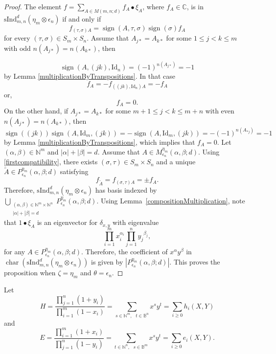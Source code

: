 \documentclass[12pt,reqno]{amsart}
\theoremstyle{definition}
\theoremstyle{remark}
\newcommand{\ind}{\mathrm{sInd}_{m,n}^{d}}
\DeclareMathOperator{\ch}{char}
\DeclareMathOperator{\sign}{sign}
\begin{document}
\begin{proof}
The element $f = \sum_{A\in M(m,n;d)}f_{A}\bullet\xi_{A}$, where $f_{A}\in\mathbb{C}$, is in $\ind(\eta_{m}\otimes \epsilon_{n})$ if and only if
\begin{equation}\label{secondcompatibility}
    f_{(\tau,\sigma)A}=\sign(A,\tau,\sigma)\sign(\sigma)f_{A}
\end{equation}
for every $(\tau,\sigma)\in S_m\times S_n$. Assume that $A_{j*}=A_{k*}$ for some $1\leq j<k\leq m$ with odd $n(A_{j*})=n(A_{k*})$, then

$$\sign(A,(jk),\mathrm{Id}_{n})=(-1)^{n(A_{j*})}=-1$$
by Lemma \ref{multiplicationByTranspositions}. In that case $$f_{A}=-f_{((jk),\mathrm{Id}_{n})A}=-f_{A}$$ or, $$f_{A}=0.$$ On the other hand, if $A_{j*}=A_{k*}$ for some $m+1\leq j<k\leq m+n$ with even  $n(A_{j*})=n(A_{k*})$, then $$\sign((jk))\sign(A,\mathrm{Id}_{m},(jk))=-\sign(A,\mathrm{Id}_{m},(jk))=-(-1)^{n(A_{*j})}=-1$$ by Lemma \ref{multiplicationByTranspositions}, which implies that $f_{A}=0$. Let $(\alpha,\beta)\in\mathbb{N}^{m}$ and $|\alpha|+|\beta|=d$. Assume that $A\in M^{\eta_{m}}_{\epsilon_{n}}(\alpha,\beta;d)$. Using \eqref{firstcompatibility}, there exists $(\sigma,\tau)\in S_{m}\times S_n$ and a unique $\tilde{A}\in P^{\eta_{m}}_{\epsilon_{n}}(\alpha,\beta;d)$ satisfying
$$f_{\tilde{A}}=f_{(\sigma,\tau)A}=\pm f_{A}.$$
Therefore, $\ind(\eta_{m}\otimes \epsilon_{n})$ has basis indexed by $\bigcup_{\substack{(\alpha,\beta)\in\mathbb{N}^{m}\times\mathbb{N}^{n}\\|\alpha|+|\beta|=d}}P^{\eta_{m}}_{\epsilon_{n}}(\alpha,\beta;d)$. Using Lemma~\ref{compositionMultiplication}, note that $1\bullet\xi_{A}$ is an eigenvector for $\delta_{x,y}$ with eigenvalue $$\prod_{i=1}^{m}x_{i}^{\alpha_{i}}\prod_{j=1}^{n}{y_{j}}^{\beta_{j}},$$ for any $A\in P^{\eta_{m}}_{\epsilon_{n}}(\alpha,\beta;d)$. Therefore, the coefficient of $x^{\alpha}y^{\beta}$ in $\ch(\ind(\eta_{m}\otimes \epsilon_{n}))$ is given by $|P^{\eta_{m}}_{\epsilon_{n}}(\alpha,\beta;d)|$. This proves the proposition when $\zeta=\eta_{m}$ and $\theta=\epsilon_{n}$.
\end{proof}
Let $$H=\frac{\prod_{j=1}^{n}(1+y_{i})}{\prod_{i=1}^{m}(1-x_{i})}=\sum_{s\in\mathbb{N}^{m},\text{ }t\in \mathbb{B}^{n}} x^{s}y^{t}=\sum_{i\geq 0}h_{i}(X,Y)$$ and 
$$E=\frac{\prod_{i=1}^{m}(1+x_{i})}{\prod_{j=1}^{n}(1-y_{i})}=\sum_{t\in\mathbb{N}^{n},\text{ }s\in \mathbb{B}^{m}} x^{s}y^{t}=\sum_{i\geq 0}e_{i}(X,Y).$$
\end{document}

